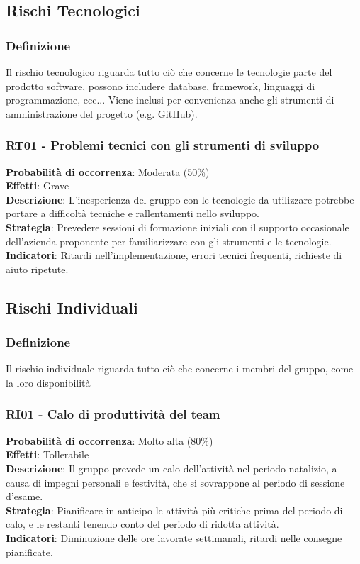 \documentclass[a4paper,12pt]{article}
\begin{document}
\subsection{Rischi Tecnologici}

\subsubsection{Definizione}
Il rischio tecnologico riguarda tutto ciò che concerne le tecnologie parte del prodotto software, possono includere database, framework, linguaggi di programmazione, ecc... Viene inclusi per convenienza anche gli strumenti di amministrazione del progetto (e.g. GitHub).

\subsubsection{RT01 - Problemi tecnici con gli strumenti di sviluppo}
\label{RT01}
\textbf{Probabilità di occorrenza}: Moderata (50\%)\\
\textbf{Effetti}: Grave\\
\textbf{Descrizione}: L'inesperienza del gruppo con le tecnologie da utilizzare potrebbe portare a difficoltà tecniche e rallentamenti nello sviluppo.\\
\textbf{Strategia}: Prevedere sessioni di formazione iniziali con il supporto occasionale dell'azienda proponente per familiarizzare con gli strumenti e le tecnologie.\\
\textbf{Indicatori}: Ritardi nell'implementazione, errori tecnici frequenti, richieste di aiuto ripetute.




\subsection{Rischi Individuali}

\subsubsection{Definizione}
Il rischio individuale riguarda tutto ciò che concerne i membri del gruppo, come la loro disponibilità

\subsubsection{RI01 - Calo di produttività del team}
\label{RI01}
\textbf{Probabilità di occorrenza}: Molto alta (80\%)\\
\textbf{Effetti}: Tollerabile\\
\textbf{Descrizione}: Il gruppo prevede un calo dell'attività nel periodo natalizio, a causa di impegni personali e festività, che si sovrappone al periodo di sessione d'esame.\\
\textbf{Strategia}: Pianificare in anticipo le attività più critiche prima del periodo di calo, e le restanti tenendo conto del periodo di ridotta attività.\\
\textbf{Indicatori}: Diminuzione delle ore lavorate settimanali, ritardi nelle consegne pianificate.
\end{document}
